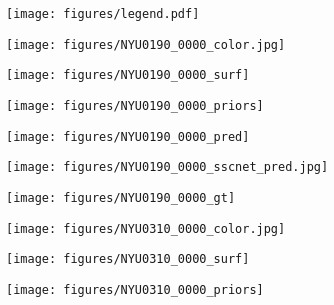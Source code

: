 \begin{figure*}[ht!]
\centering  


\begin{subfigure}{\textwidth}
  \texttt{[image: figures/legend.pdf]}
  
  \end{subfigure}

\bigskip


\begin{subfigure}{0.160\textwidth}
\texttt{[image: figures/NYU0190\_0000\_color.jpg]}

\end{subfigure}
\begin{subfigure}{0.160\textwidth}
\texttt{[image: figures/NYU0190\_0000\_surf]}
\end{subfigure}
\begin{subfigure}{0.160\textwidth}
\texttt{[image: figures/NYU0190\_0000\_priors]}

\end{subfigure}
\begin{subfigure}{0.160\textwidth}
\texttt{[image: figures/NYU0190\_0000\_pred]}

\end{subfigure}
\begin{subfigure}{0.160\textwidth}
\texttt{[image: figures/NYU0190\_0000\_sscnet\_pred.jpg]}


\end{subfigure}
\begin{subfigure}{0.160\textwidth}
\texttt{[image: figures/NYU0190\_0000\_gt]}

\end{subfigure}



\begin{subfigure}{0.160\textwidth}
\texttt{[image: figures/NYU0310\_0000\_color.jpg]}

\end{subfigure}
\begin{subfigure}{0.160\textwidth}
\texttt{[image: figures/NYU0310\_0000\_surf]}

\end{subfigure}
\begin{subfigure}{0.160\textwidth}
\texttt{[image: figures/NYU0310\_0000\_priors]}


\end{subfigure}
\end{figure*}
